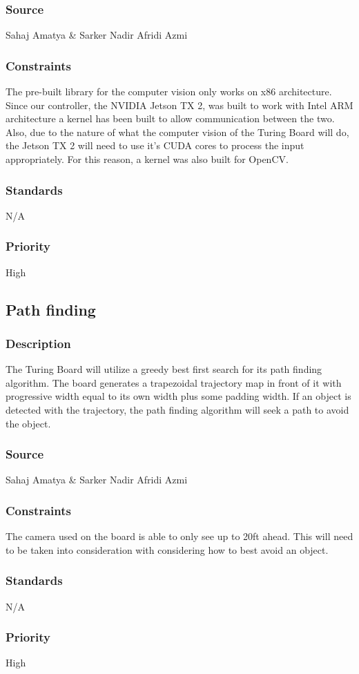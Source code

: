 \subsubsection{Source}
Sahaj Amatya & Sarker Nadir Afridi Azmi
\subsubsection{Constraints}
The pre-built library for the computer vision only works on x86 architecture. Since our controller, the NVIDIA Jetson TX 2, was built to work with Intel ARM architecture a kernel has been built to allow communication between the two. 
Also, due to the nature of what the computer vision of the Turing Board will do, the Jetson TX 2 will need to use it's CUDA cores to process the input appropriately. For this reason, a kernel was also built for OpenCV. 
\subsubsection{Standards}
N/A
\subsubsection{Priority}
High

\subsection{Path finding}
\subsubsection{Description}
The Turing Board will utilize a greedy best first search for its path finding algorithm. The board generates a trapezoidal trajectory map in front of it with progressive width equal to its own width plus some padding width. If an object is detected with the trajectory, the path finding algorithm will seek a path to avoid the object. 
\subsubsection{Source}
Sahaj Amatya \& Sarker Nadir Afridi Azmi
\subsubsection{Constraints}
The camera used on the board is able to only see up to 20ft ahead. This will need to be taken into consideration with considering how to best avoid an object.
\subsubsection{Standards}
N/A
\subsubsection{Priority}
High
